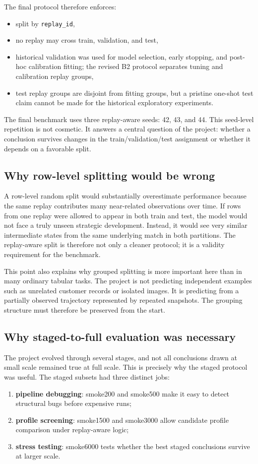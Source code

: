 \documentclass[11pt,a4paper]{article}
\begin{document}
The final protocol therefore enforces:
\begin{itemize}
    \item split by \texttt{replay\_id},
    \item no replay may cross train, validation, and test,
    \item historical validation was used for model selection, early stopping, and post-hoc calibration fitting; the revised B2 protocol separates tuning and calibration replay groups,
    \item test replay groups are disjoint from fitting groups, but a pristine one-shot test claim cannot be made for the historical exploratory experiments.
\end{itemize}

The final benchmark uses three replay-aware seeds: 42, 43, and 44. This seed-level repetition is not cosmetic. It answers a central question of the project: whether a conclusion survives changes in the train/validation/test assignment or whether it depends on a favorable split.

\subsection{Why row-level splitting would be wrong}
A row-level random split would substantially overestimate performance because the same replay contributes many near-related observations over time. If rows from one replay were allowed to appear in both train and test, the model would not face a truly unseen strategic development. Instead, it would see very similar intermediate states from the same underlying match in both partitions. The replay-aware split is therefore not only a cleaner protocol; it is a validity requirement for the benchmark.

This point also explains why grouped splitting is more important here than in many ordinary tabular tasks. The project is not predicting independent examples such as unrelated customer records or isolated images. It is predicting from a partially observed trajectory represented by repeated snapshots. The grouping structure must therefore be preserved from the start.

\subsection{Why staged-to-full evaluation was necessary}
The project evolved through several stages, and not all conclusions drawn at small scale remained true at full scale. This is precisely why the staged protocol was useful. The staged subsets had three distinct jobs:
\begin{enumerate}
    \item \textbf{pipeline debugging}: smoke200 and smoke500 make it easy to detect structural bugs before expensive runs;
    \item \textbf{profile screening}: smoke1500 and smoke3000 allow candidate profile comparison under replay-aware logic;
    \item \textbf{stress testing}: smoke6000 tests whether the best staged conclusions survive at larger scale.
\end{enumerate}
\end{document}
